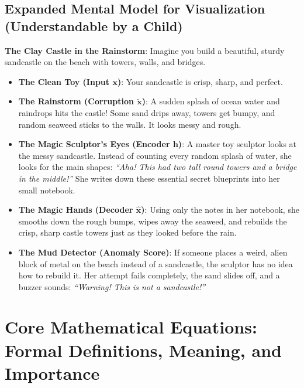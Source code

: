\documentclass[11pt,a4paper]{article}
\theoremstyle{definition}
\begin{document}
\subsection{Expanded Mental Model for Visualization (Understandable by a Child)}
\textbf{The Clay Castle in the Rainstorm}:
Imagine you build a beautiful, sturdy sandcastle on the beach with towers, walls, and bridges. 
\begin{itemize}
    \item \textbf{The Clean Toy (Input $\mathbf{x}$)}:
    Your sandcastle is crisp, sharp, and perfect.
    
    \item \textbf{The Rainstorm (Corruption $\tilde{\mathbf{x}}$)}:
    A sudden splash of ocean water and raindrops hits the castle! Some sand drips away, towers get bumpy, and random seaweed sticks to the walls. It looks messy and rough.
    
    \item \textbf{The Magic Sculptor's Eyes (Encoder $\mathbf{h}$)}:
    A master toy sculptor looks at the messy sandcastle. Instead of counting every random splash of water, she looks for the main shapes: \emph{``Aha! This had two tall round towers and a bridge in the middle!''} She writes down these essential secret blueprints into her small notebook.
    
    \item \textbf{The Magic Hands (Decoder $\hat{\mathbf{x}}$)}:
    Using only the notes in her notebook, she smooths down the rough bumps, wipes away the seaweed, and rebuilds the crisp, sharp castle towers just as they looked before the rain.
    
    \item \textbf{The Mud Detector (Anomaly Score)}:
    If someone places a weird, alien block of metal on the beach instead of a sandcastle, the sculptor has no idea how to rebuild it. Her attempt fails completely, the sand slides off, and a buzzer sounds: \emph{``Warning! This is not a sandcastle!''}
\end{itemize}

\section{Core Mathematical Equations: Formal Definitions, Meaning, and Importance}
\end{document}

